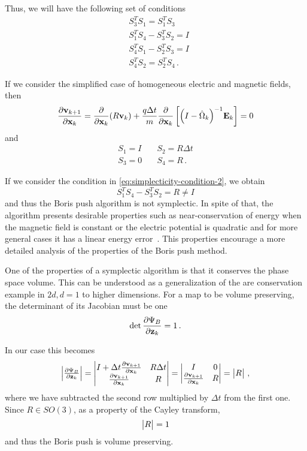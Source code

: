 \documentclass[12pt, class=report, crop=false]{standalone}
\begin{document}
Thus, we will have the following set of conditions
\begin{subequations}
  \begin{align}
    &S_3^T S_1 = S_1^T S_3 \label{eq:simplecticity-condition-1} \\
    &S_1^T S_4 - S_3^T S_2 = I \label{eq:simplecticity-condition-2} \\
    &S_4^T S_1 - S_2^T S_3 = I \label{eq:simplecticity-condition-3} \\
    &S_4^T S_2 = S_2^T S_4 \label{eq:simplecticity-condition-4}\,.
  \end{align}
\end{subequations}

If we consider the simplified case of homogeneous electric and magnetic fields,
then
\[
\pdv{\vb{v}_{k+1}}{\vb{x}_k} = \pdv{\vb{x}_k} (R \vb{v}_k) +
\frac{q \Delta t}{m} \pdv{\vb{x}_k} \left[{\left(I-\hat{\Omega}_k\right)}^{-1}\vb{E}_k\right]
=0
\]
and
\begin{align*}
  S_1 = I &\quad S_2 = R \Delta t \\
  S_3 = 0 &\quad S_4 = R\,.
\end{align*}

If we consider the condition in \cref{eq:simplecticity-condition-2}, we obtain
\[
S_1^T S_4 - S_3^T S_2 = R \neq I
\]
and thus the Boris push algorithm is not symplectic. In spite of that, the algorithm
presents desirable properties such as near-conservation of energy when the
magnetic field is constant or the electric potential is quadratic and for more
general cases it has a linear energy error~\autocite{hairer_energybehaviour_2018}.
This properties encourage a more detailed analysis of the properties of the Boris
push method.

One of the properties of a symplectic algorithm is that it conserves the phase space
volume. This can be understood as a generalization of the are conservation example
in \(2d, d=1\) to higher dimensions. For a map to be volume preserving, the
determinant of its Jacobian must be one
\[
\det \pdv{\Psi_B}{\vb{z}_k} = 1\,.
\]

In our case this becomes
\[
\mdet{\pdv{\Psi_B}{\vb{z}_k}} =
\mdet{I + \Delta t \pdv{\vb{v}_{k+1}}{\vb{x}_k} & R \Delta t \\
      \pdv{\vb{v}_{k+1}}{\vb{x}_k} & R}
=
\mdet{I & 0 \\
      \pdv{\vb{v}_{k+1}}{\vb{x}_k} & R}
= \mdet{R}\,,
\]
where we have subtracted the second row multiplied by \(\Delta t\) from the first
one. Since \(R \in SO(3)\), as a property of the Cayley transform,
\[
\mdet{R} = 1
\]
and thus the Boris push is volume preserving.
\end{document}
